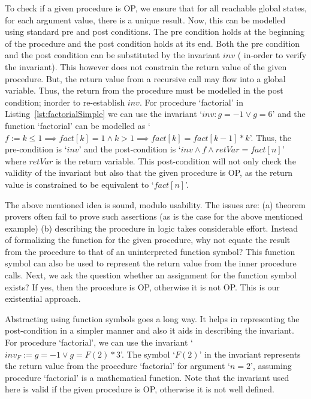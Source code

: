 \documentclass{llncs}
\newcommand{\inv}{\mathit{inv}}
\newcommand{\retVar}{\textit{retVar}}
\newcommand{\F}{\mathit{F}}
\newcommand{\fact}{\mathit{fact}}
\begin{document}
To check if a given procedure is OP, we ensure that for all reachable
global states, for each argument value, there is a unique result. Now,
this can be modelled using standard pre and post conditions. The pre
condition holds at the beginning of the procedure and the post
condition holds at its end. Both the pre condition and the post
condition can be substituted by the invariant $\inv$ ( in-order to
verify the invariant). This however does not constrain the return
value of the given procedure. But, the return value from a recursive
call may flow into a global variable. Thus, the return from the
procedure must be modelled in the post condition; inorder to
re-establish $\inv$.  For procedure `factorial' in
Listing~\ref{lst:factorialSimple} we can use the invariant `$\inv : g
= -1 \vee g = 6$' and the function `factorial' can be modelled as `$ f
:= k \leq 1 \implies \fact[k] = 1 \wedge k >1 \implies \fact[k] =
\fact[k-1]*k$'. Thus, the pre-condition is `$\inv$' and the
post-condition is `$\inv \wedge f \wedge \retVar = fact[n]$' where
$\retVar$ is the return variable. This post-condition will not only
check the validity of the invariant but also that the given procedure
is OP, as the return value is constrained to be equivalent to
`$fact[n]$'.

The above mentioned idea is sound, modulo usability. The issues are:
(a) theorem provers often fail to prove such assertions (as is the
case for the above mentioned example) (b) describing the procedure in
logic takes considerable effort.  Instead of formalizing the function
for the given procedure, why not equate the result from the procedure
to that of an uninterpreted function symbol? This function symbol can
also be used to represent the return value from the inner procedure
calls. Next, we ask the question whether an assignment for the
function symbol exists? If yes, then the procedure is OP, otherwise it
is not OP.  This is our existential approach.

Abstracting using function symbols goes a long way. It helps in
representing the post-condition in a simpler manner and also it aids
in describing the invariant. For procedure `factorial', we can use
the invariant `$\inv_{\F}:=g = -1 \vee g = \F(2) * 3$'. The symbol
`$\F(2)$' in the invariant represents the return value from the
procedure `factorial' for argument `$n = 2$', assuming procedure
`factorial' is a mathematical function. Note that the invariant used
here is valid if the given procedure is OP, otherwise it is not well
defined.

\end{document}
